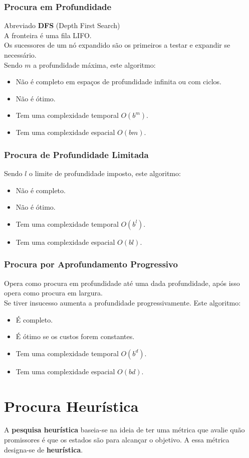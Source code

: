 \documentclass[]{report}
\begin{document}
\subsection{Procura em Profundidade}
Abreviado \textbf{DFS} (Depth First Search)\\
A fronteira é uma fila LIFO.\\
Os sucessores de um nó expandido são os primeiros a testar e expandir se necessário.\\
Sendo $m$ a profundidade máxima, este algoritmo:
\begin{itemize}
	\item Não é completo em espaços de profundidade infinita ou com ciclos.
	\item Não é ótimo.
	\item Tem uma complexidade temporal $O(b^m)$.
	\item Tem uma complexidade espacial $O(bm)$.
\end{itemize}
\subsection{Procura de Profundidade Limitada}
Sendo $l$ o limite de profundidade imposto, este algoritmo:
\begin{itemize}
	\item Não é completo.
	\item Não é ótimo.
	\item Tem uma complexidade temporal $O(b^l)$.
	\item Tem uma complexidade espacial $O(bl)$.
\end{itemize}
\subsection{Procura por Aprofundamento Progressivo}
Opera como procura em profundidade até uma dada profundidade, após isso opera como procura em largura.\\
Se tiver insucesso aumenta a profundidade progressivamente.
Este algoritmo:
\begin{itemize}
	\item É completo.
	\item É ótimo se os custos forem constantes.
	\item Tem uma complexidade temporal $O(b^d)$.
	\item Tem uma complexidade espacial $O(bd)$.
\end{itemize}
\chapter{Procura Heurística}
A \textbf{pesquisa heurística} baseia-se na ideia de ter uma métrica que avalie quão promissores é que os estados são para alcançar o objetivo.
A essa métrica designa-se de \textbf{heurística}.
\end{document}
